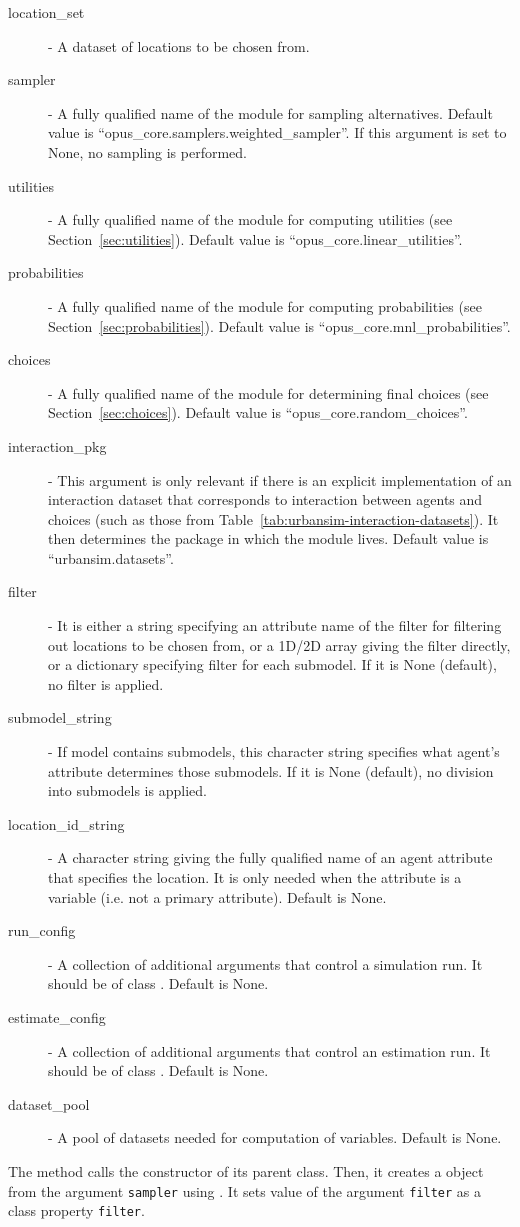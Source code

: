 \begin{description}
\item[location_set] - A dataset of locations to be chosen from.
\item[sampler] - A fully qualified name of the module for sampling
  alternatives. Default value is ``opus_core.samplers.weighted_sampler''. If
  this argument is set to None, no sampling is performed.
\item[utilities] - A fully qualified name of the module for computing utilities
  (see Section~\ref{sec:utilities}). Default value is
  ``opus_core.linear_utilities''.
\item[probabilities] - A fully qualified name of the module for computing
  probabilities (see Section~\ref{sec:probabilities}). Default value is
  ``opus_core.mnl_probabilities''.
\item[choices] - A fully qualified name of the module for determining
  final choices (see Section~\ref{sec:choices}). Default value is
  ``opus_core.random_choices''.
\item[interaction_pkg] - This argument is only relevant if there is an
  explicit implementation of an interaction dataset that corresponds to
  interaction between agents and choices (such as those from
  Table~\ref{tab:urbansim-interaction-datasets}). It then determines the
  package in which the module lives. Default value is
  ``urbansim.datasets''. \datasetindex
\item[filter] - It is either a string specifying an attribute name of the
  filter for filtering out locations to be chosen from, or a 1D/2D array giving the filter directly, or a dictionary
  specifying filter for each submodel. If it is None (default), no filter is
  applied.
\item[submodel_string] - If model contains submodels, this character string
  specifies what agent's attribute determines those submodels. If it is None
  (default), no division into submodels is applied.
\item[location_id_string] - A character string giving the fully qualified name of an agent attribute
  that specifies the location. It is only needed when the attribute is a variable (i.e. not a primary attribute).
  Default is None.
\item[run_config] - A collection of additional arguments that control a
  simulation run. It should be of class . Default is None.
\item[estimate_config] - A collection of additional arguments that control an
  estimation run. It should be of class . Default is None.
\item[dataset_pool] - A pool of datasets needed for computation of variables. Default is None.
\end{description}
The method calls the constructor of its parent class. Then, it creates a
 object from the argument \verb|sampler| using
. It sets value of the argument \verb|filter| as a class
property \verb|filter|.

